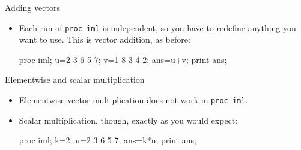 \documentclass[unknownkeysallowed]{beamer}\usepackage[]{graphicx}\usepackage[]{color}
\begin{document}
\begin{frame}[fragile]{Adding vectors}
  
  \begin{itemize}
  \item Each run of \texttt{proc iml} is independent, so you have to
    redefine anything you want to use. This is vector addition, as before:
    
    \begin{Sascode}[store=imb]
proc iml;
  u={2 3 6 5 7};
  v={1 8 3 4 2};
  ans=u+v;
  print ans;
    \end{Sascode}
    
    
  \end{itemize}
  
\end{frame}

\begin{frame}[fragile]{Elementwise and scalar multiplication}
  
  \begin{itemize}
  \item Elementwise vector multiplication does not work in
    \texttt{proc iml}.
  \item Scalar multiplication, though, exactly as you would expect:

        \begin{Sascode}[store=imc]
proc iml;
  k=2;
  u={2 3 6 5 7};
  ans=k*u;
  print ans;
    \end{Sascode}
    

  \end{itemize}
  
\end{frame}


\end{document}
